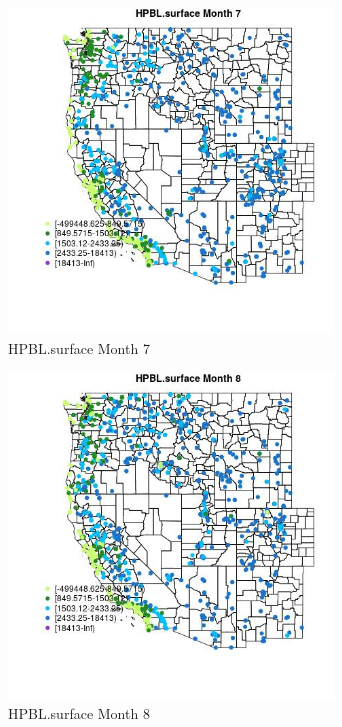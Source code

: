 \begin{figure} 
\centering  
\includegraphics[width=0.77\textwidth]{Code_Outputs/Report_ML_input_PM25_Step4_part_e_de_duplicated_aves_compiled_2019-05-21wNAs_MapObsMo7HPBLsurface.jpg} 
\caption{\label{fig:Report_ML_input_PM25_Step4_part_e_de_duplicated_aves_compiled_2019-05-21wNAsMapObsMo7HPBLsurface}HPBL.surface Month 7} 
\end{figure} 
 

\begin{figure} 
\centering  
\includegraphics[width=0.77\textwidth]{Code_Outputs/Report_ML_input_PM25_Step4_part_e_de_duplicated_aves_compiled_2019-05-21wNAs_MapObsMo8HPBLsurface.jpg} 
\caption{\label{fig:Report_ML_input_PM25_Step4_part_e_de_duplicated_aves_compiled_2019-05-21wNAsMapObsMo8HPBLsurface}HPBL.surface Month 8} 
\end{figure} 
 

